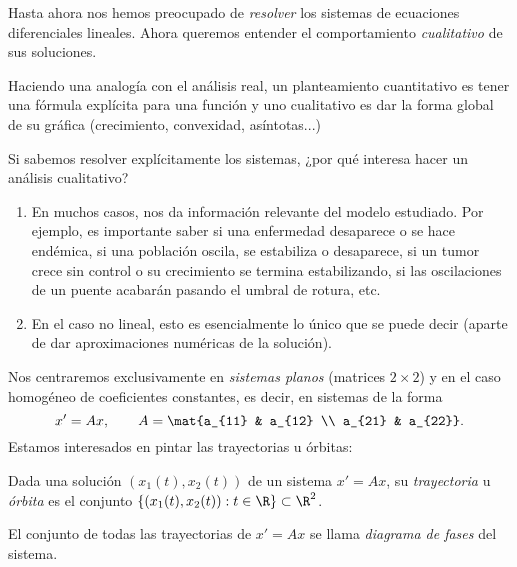 \documentclass[../ecuaciones_diferenciales.tex]{subfiles}
\begin{document}
Hasta ahora nos hemos preocupado de \emph{resolver} los sistemas de ecuaciones
diferenciales lineales. Ahora queremos entender el comportamiento
\emph{cualitativo} de sus soluciones.

Haciendo una analogía con el análisis real, un planteamiento cuantitativo es
tener una fórmula explícita para una función y uno cualitativo es dar la forma
global de su gráfica (crecimiento, convexidad, asíntotas...)

Si sabemos resolver explícitamente los sistemas, ¿por qué interesa hacer un
análisis cualitativo?

\begin{enumerate}[1)]
	\item En muchos casos, nos da información relevante del modelo estudiado. Por
	      ejemplo, es importante saber si una enfermedad desaparece o se hace endémica,
	      si una población oscila, se estabiliza o desaparece, si un tumor crece sin
	      control o su crecimiento se termina estabilizando, si las oscilaciones de un
	      puente acabarán pasando el umbral de rotura, etc.

	\item En el caso no lineal, esto es esencialmente lo único que se puede decir
	      (aparte de dar aproximaciones numéricas de la solución).
\end{enumerate}

Nos centraremos exclusivamente en \emph{sistemas planos} (matrices \(2 \times 2\))
y en el caso homogéneo de coeficientes constantes, es decir, en sistemas de la
forma
\[x' = Ax, \qquad A = \mat{a_{11} & a_{12} \\ a_{21} & a_{22}}.\]
Estamos interesados en pintar las trayectorias u órbitas:

\begin{definition}
	Dada una solución \((x_1(t), x_2(t))\) de un sistema \(x' = Ax\), su
	\emph{trayectoria} u \emph{órbita} es el conjunto
	\(\{(x_1(t), x_2(t)) : t \in \R\} \subset \R^2\).
\end{definition}

\begin{definition}
	El conjunto de todas las trayectorias de \(x' = Ax\) se llama \emph{diagrama
		de fases} del sistema.
\end{definition}
\end{document}
